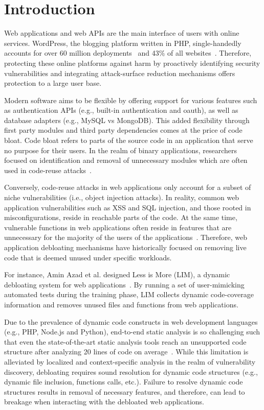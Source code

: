 \section{Introduction}

Web applications and web APIs are the main interface of users with online services. 
WordPress, the blogging platform written in PHP, single-handedly accounts for over 60 million deployments~\cite{wpstatsbuildwith} and 43\% of all websites~\cite{wpstatsw3techs}. 
Therefore, protecting these online platforms against harm by proactively identifying security vulnerabilities and integrating attack-surface reduction mechanisms offers protection to a large user base. 

Modern software aims to be flexible by offering support for various features such as authentication APIs (e.g., built-in authentication and oauth), as well as database adapters (e.g., MySQL vs MongoDB). 
This added flexibility through first party modules and third party dependencies comes at the price of code bloat. 
Code bloat refers to parts of the source code in an application that serve no purpose for their users. 
In the realm of binary applications, researchers focused on identification and removal of unnecessary modules which are often used in code-reuse attacks~\cite{redini2019b, quach2018debloating, 255308}. 

Conversely, code-reuse attacks in web applications only account for a subset of niche vulnerabilities (i.e., object injection attacks). 
In reality, common web application vulnerabilities such as XSS and SQL injection, and those rooted in misconfigurations, reside in reachable parts of the code. 
At the same time, vulnerable functions in web applications often reside in features that are unnecessary for the majority of the users of the applications~\cite{azad2019less}. 
Therefore, web application debloating mechanisms have historically focused on removing live code that is deemed unused under specific workloads. 

For instance, Amin Azad et al. designed Less is More (LIM), a dynamic debloating system for web applications~\cite{azad2019less}. 
By running a set of user-mimicking automated tests during the training phase, LIM collects dynamic code-coverage information and removes unused files and functions from web applications. 

Due to the prevalence of dynamic code constructs in web development languages (e.g., PHP, Node.js and Python), end-to-end static analysis is so challenging such that even the state-of-the-art static analysis tools reach an unsupported code structure after analyzing 20 lines of code on average~\cite{altestability}. 
While this limitation is alleviated by localized and context-specific analysis in the realm of vulnerability discovery, debloating requires sound resolution for dynamic code structures (e.g., dynamic file inclusion, functions calls, etc.). 
Failure to resolve dynamic code structures results in removal of necessary features, and therefore, can lead to breakage when interacting with the debloated web applications.

